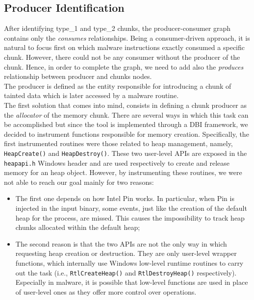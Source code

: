 \documentclass[LaM,binding=0.6cm]{sapthesis}
\begin{document}
\subsection{Producer Identification}
\label{subsec:produceridentification}
After identifying type\_1 and type\_2 chunks, the producer-consumer graph contains only the \textit{consumes} relationships. Being a consumer-driven approach, it is natural to focus first on which malware instructions exactly consumed a specific chunk. However, there could not be any consumer without the producer of the chunk. Hence, in order to complete the graph, we need to add also the \textit{produces} relationship between producer and chunks nodes.\\

The producer is defined as the entity responsible for introducing a chunk of tainted data which is later accessed by a malware routine.\\
The first solution that comes into mind, consists in defining a chunk producer as the \textit{allocator} of the memory chunk. There are several ways in which this task can be accomplished but since the tool is implemented through a DBI framework, we decided to instrument functions responsible for memory creation. Specifically, the first instrumented routines were those related to heap management, namely, \texttt{HeapCreate()} and \texttt{HeapDestroy()}. These two user-level APIs are exposed in the \texttt{heapapi.h} Windows header\cite{heapapih77:online} and are used respectively to create and release memory for an heap object. However, by instrumenting these routines, we were not able to reach our goal mainly for two reasons:
\begin{itemize}
\item The first one depends on how Intel Pin works. In particular, when Pin is injected in the input binary, some events, just like the creation of the default heap for the process, are missed. This causes the impossibility to track heap chunks allocated within the default heap;
\item The second reason is that the two APIs are not the only way in which requesting heap creation or destruction. They are only user-level wrapper functions, which internally use Windows low-level runtime routines to carry out the task (i.e., \texttt{RtlCreateHeap()} and \texttt{RtlDestroyHeap()} respectively). Especially in malware, it is possible that low-level functions are used in place of user-level ones as they offer more control over operations.
\end{itemize} 
\end{document}
